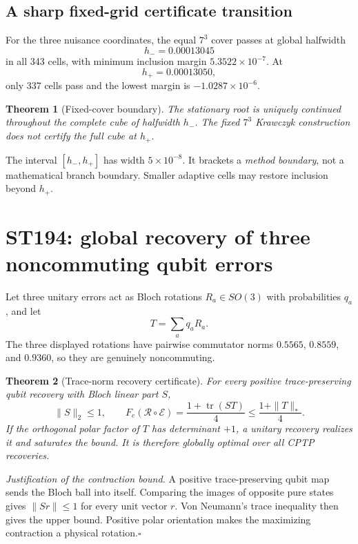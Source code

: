 \documentclass[11pt,a4paper]{article}
\newtheorem{theorem}{Theorem}[section]
\begin{document}
\subsection{A sharp fixed-grid certificate transition}

For the three nuisance coordinates, the equal $7^3$ cover passes at global halfwidth
\[
h_-=0.00013045
\]
in all 343 cells, with minimum inclusion margin $5.3522\times10^{-7}$. At
\[
h_+=0.00013050,
\]
only 337 cells pass and the lowest margin is $-1.0287\times10^{-6}$.

\begin{theorem}[Fixed-cover boundary]
The stationary root is uniquely continued throughout the complete cube of halfwidth $h_-$. The fixed $7^3$ Krawczyk construction does not certify the full cube at $h_+$.
\end{theorem}

The interval $[h_-,h_+]$ has width $5\times10^{-8}$. It brackets a \emph{method boundary}, not a mathematical branch boundary. Smaller adaptive cells may restore inclusion beyond $h_+$.

\section{ST194: global recovery of three noncommuting qubit errors}

Let three unitary errors act as Bloch rotations $R_a\in SO(3)$ with probabilities $q_a$, and let
\[
T=\sum_aq_aR_a.
\]
The three displayed rotations have pairwise commutator norms $0.5565$, $0.8559$, and $0.9360$, so they are genuinely noncommuting.

\begin{theorem}[Trace-norm recovery certificate]
For every positive trace-preserving qubit recovery with Bloch linear part $S$,
\[
\|S\|_2\le1,
\qquad
F_e(\mathcal R\circ\mathcal E)=\frac{1+\operatorname{tr}(ST)}4
\le\frac{1+\|T\|_*}{4}.
\]
If the orthogonal polar factor of $T$ has determinant $+1$, a unitary recovery realizes it and saturates the bound. It is therefore globally optimal over all CPTP recoveries.
\end{theorem}

\emph{Justification of the contraction bound.} A positive trace-preserving qubit map sends the Bloch ball into itself. Comparing the images of opposite pure states gives $\|Sr\|\le1$ for every unit vector $r$. Von Neumann's trace inequality then gives the upper bound. Positive polar orientation makes the maximizing contraction a physical rotation.\hfill$\square$
\end{document}
